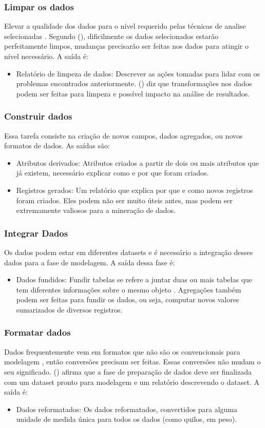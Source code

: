 \subsubsection{Limpar os dados}
Elevar a qualidade dos dados para o nível requerido pelas técnicas de analise selecionadas \citep[21]{crispmanual}.
Segundo \citeauthor{dmfd} (\citeyear[83]{dmfd}), dificilmente os dados selecionados estarão perfeitamente limpos, mudanças precisarão ser feitas nos dados para atingir o nível necessário.
A saída é:
\begin{itemize}
    \item Relatório de limpeza de dados: Descrever as ações tomadas para lidar com os problemas encontrados anteriormente. \citeauthor{crispmanual} (\citeyear[21]{crispmanual}) diz que transformações nos dados podem ser feitas para limpeza e possível impacto na análise de resultados.
\end{itemize}
\subsubsection{Construir dados}
Essa tarefa consiste na criação de novos campos, dados agregados, ou novos formatos de dados. 
As saídas são:
\begin{itemize}
    \item Atributos derivados: Atributos criados a partir de dois ou mais atributos que já existem, necessário explicar como e por que foram criados.
    \item Registros gerados: Um relatório que explica por que e como novos registros foram criados. Eles podem não ser muito úteis antes, mas podem ser extremamente valiosos para a mineração de dados.
\end{itemize}
\subsubsection{Integrar Dados}
Os dados podem estar em diferentes datasets e é necessário a integração desses dados para a fase de modelagem.
A saída dessa fase é:
\begin{itemize}
    \item Dados fundidos: Fundir tabelas se refere a juntar duas ou mais tabelas que tem diferentes informações sobre o mesmo objeto \citep[22]{crispmanual}. Agregações também podem ser feitas para fundir os dados, ou seja, computar novos valores sumarizados de diversos registros.
\end{itemize}
\subsubsection{Formatar dados}
Dados frequentemente vem em formatos que não são os convencionais para modelagem \citep[83]{dmfd}, então conversões precisam ser feitas. Essas conversões não mudam o seu significado. \citeauthor{dmfd} (\citeyear[84]{dmfd}) afirma que a fase de preparação de dados deve ser finalizada com um dataset pronto para modelagem e um relatório descrevendo o dataset.
A saída é: 
\begin{itemize}
    \item Dados reformatados: Os dados reformatados, convertidos para alguma unidade de medida única para todos os dados (como quilos, em peso).
\end{itemize}
